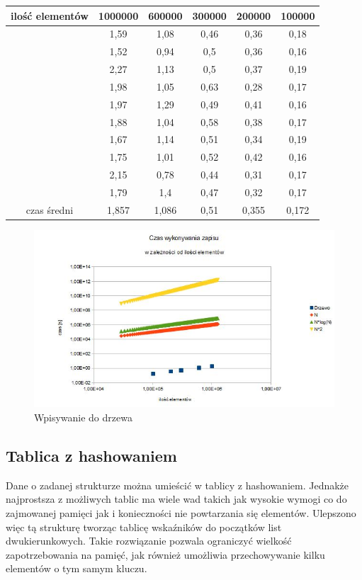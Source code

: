 \documentclass[12pt,a4paper,titlepage]{article}
\begin{document}
\begin{center}
\begin {tabular}{|c|c|c|c|c|c|}\hline
ilość elementów&1000000&600000&300000&200000&100000\\\hline
&1,59&1,08&0,46&0,36&0,18\\\hline
&1,52&0,94&0,5&0,36&0,16\\\hline
&2,27&1,13&0,5&0,37&0,19\\\hline
&1,98&1,05&0,63&0,28&0,17\\\hline
&1,97&1,29&0,49&0,41&0,16\\\hline
&1,88&1,04&0,58&0,38&0,17\\\hline
&1,67&1,14&0,51&0,34&0,19\\\hline
&1,75&1,01&0,52&0,42&0,16\\\hline
&2,15&0,78&0,44&0,31&0,17\\\hline
&1,79&1,4&0,47&0,32&0,17\\\hline
czas średni&1,857&1,086&0,51&0,355&0,172\\\hline
\end{tabular}
\end {center}
\begin{figure}[h]
\begin{center}
\includegraphics[scale=0.7]{wpisywanie_drzewo.jpg}
\caption{Wpisywanie do drzewa}
\end{center}
\end{figure}

\subsection{Tablica z hashowaniem}
Dane o zadanej strukturze można umieścić w tablicy z hashowaniem. Jednakże najprostsza z możliwych tablic ma wiele wad takich jak wysokie wymogi co do zajmowanej pamięci jak i konieczności nie powtarzania się elementów. Ulepszono więc tą strukturę tworząc tablicę wskaźników do początków list dwukierunkowych. Takie rozwiązanie pozwala ograniczyć wielkość zapotrzebowania na pamięć, jak również umożliwia przechowywanie kilku elementów o tym samym kluczu.
\end{document}
